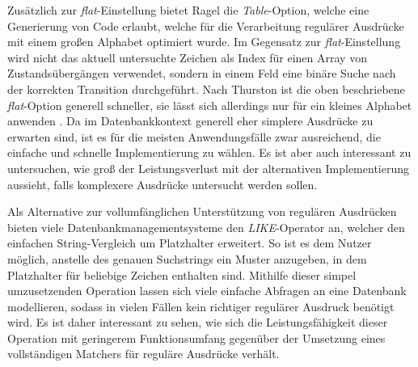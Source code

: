 Zusätzlich zur \emph{flat}-Einstellung bietet Ragel die \emph{Table}-Option, welche eine Generierung von Code erlaubt, welche für die Verarbeitung regulärer Ausdrücke mit einem großen Alphabet optimiert wurde.
Im Gegensatz zur \emph{flat}-Einstellung wird nicht das aktuell untersuchte Zeichen als Index für einen Array von Zustandsübergängen verwendet, sondern in einem Feld eine binäre Suche nach der korrekten Transition durchgeführt.
Nach Thurston ist die oben beschriebene \emph{flat}-Option generell schneller, sie lässt sich allerdings nur für ein kleines Alphabet anwenden \cite{Thurston2009}.
Da im Datenbankkontext generell eher simplere Ausdrücke zu erwarten sind, ist es für die meisten Anwendungsfälle zwar ausreichend, die einfache und schnelle Implementierung zu wählen.
Es ist aber auch interessant zu untersuchen, wie groß der Leistungsverlust mit der alternativen Implementierung aussieht, falls komplexere Ausdrücke untersucht werden sollen.

Als Alternative zur vollumfänglichen Unterstützung von regulären Ausdrücken bieten viele Datenbankmanagementsysteme den \emph{LIKE}-Operator an, welcher den einfachen String-Vergleich um Platzhalter erweitert.
So ist es dem Nutzer möglich, anstelle des genauen Suchstrings ein Muster anzugeben, in dem Platzhalter für beliebige Zeichen enthalten sind.
Mithilfe dieser simpel umzusetzenden Operation lassen sich viele einfache Abfragen an eine Datenbank modellieren, sodass in vielen Fällen kein richtiger regulärer Ausdruck benötigt wird.
Es ist daher interessant zu sehen, wie sich die Leistungsfähigkeit dieser Operation mit geringerem Funktionsumfang gegenüber der Umsetzung eines vollständigen Matchers für reguläre Ausdrücke verhält.